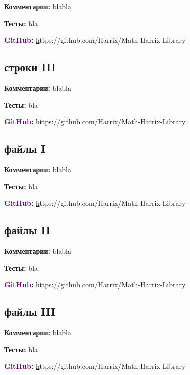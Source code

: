 \documentclass[a4paper,,titlepage]{report}
\newcommand{\gitlink}[1]{\textsf{\textbf {\textcolor{purple}{GitHub}:  }}\selectfont \href{}#1\par}
\newcommand{\comments}[1]{\textsf{\textbf {Комментарии:  }}#1\par}
\newcommand{\tests}[1]{\textsf{\textbf {Тесты:  }}#1\par}
\begin{document}
 \begin{flushleft}
\comments{bla\newline bla}
\tests{bla} 
\gitlink{https://github.com/Harrix/Math-Harrix-Library}
\end{flushleft}


\begin{center}\section{строки III}\end{center}
 
 \begin{flushleft}
\comments{bla\newline bla}
\tests{bla} 
\gitlink{https://github.com/Harrix/Math-Harrix-Library}
\end{flushleft}


\begin{center}\section{файлы I}\end{center}
 
 \begin{flushleft}
\comments{bla\newline bla}
\tests{bla} 
\gitlink{https://github.com/Harrix/Math-Harrix-Library}
\end{flushleft}


\begin{center}\section{файлы II}\end{center}
 
 \begin{flushleft}
\comments{bla\newline bla}
\tests{bla} 
\gitlink{https://github.com/Harrix/Math-Harrix-Library}
\end{flushleft}



\begin{center}\section{файлы III}\end{center}
 
 \begin{flushleft}
\comments{bla\newline bla}
\tests{bla} 
\gitlink{https://github.com/Harrix/Math-Harrix-Library}
\end{flushleft}
\end{document}
